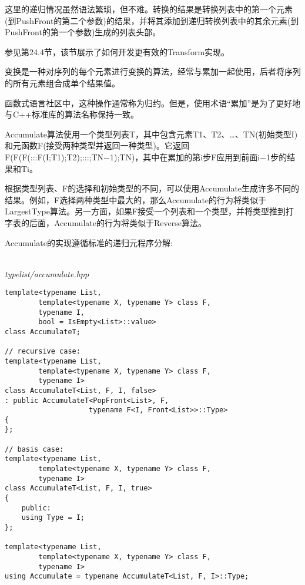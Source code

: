 这里的递归情况虽然语法繁琐，但不难。转换的结果是转换列表中的第一个元素(到PushFront的第二个参数)的结果，并将其添加到递归转换列表中的其余元素(到PushFront的第一个参数)生成的列表头部。

参见第24.4节，该节展示了如何开发更有效的Transform实现。


变换是一种对序列的每个元素进行变换的算法，经常与累加一起使用，后者将序列的所有元素组合成单个结果值。

\begin{tcolorbox}[colback=webgreen!5!white,colframe=webgreen!75!black]
\hspace*{0.75cm}函数式语言社区中，这种操作通常称为归约。但是，使用术语“累加”是为了更好地与C++标准库的算法名称保持一致。
\end{tcolorbox}

Accumulate算法使用一个类型列表T，其中包含元素T1、T2、…、TN(初始类型I)和元函数F(接受两种类型并返回一种类型)。它返回F(F(F(:::F(I;T1);T2);:::;TN−1);TN)，其中在累加的第i步F应用到前面i−1步的结果和Ti。

根据类型列表、F的选择和初始类型的不同，可以使用Accumulate生成许多不同的结果。例如，F选择两种类型中最大的，那么Accumulate的行为将类似于LargestType算法。另一方面，如果F接受一个列表和一个类型，并将类型推到打字表的后面，Accumulate的行为将类似于Reverse算法。

Accumulate的实现遵循标准的递归元程序分解:

\hspace*{\fill} \\ %
\noindent
\textit{typelist/accumulate.hpp}
\begin{lstlisting}[style=styleCXX]
template<typename List,
		template<typename X, typename Y> class F,
		typename I,
		bool = IsEmpty<List>::value>
class AccumulateT;

// recursive case:
template<typename List,
		template<typename X, typename Y> class F,
		typename I>
class AccumulateT<List, F, I, false>
: public AccumulateT<PopFront<List>, F,
					typename F<I, Front<List>>::Type>
{
};

// basis case:
template<typename List,
		template<typename X, typename Y> class F,
		typename I>
class AccumulateT<List, F, I, true>
{
	public:
	using Type = I;
};

template<typename List,
		template<typename X, typename Y> class F,
		typename I>
using Accumulate = typename AccumulateT<List, F, I>::Type;
\end{lstlisting}

